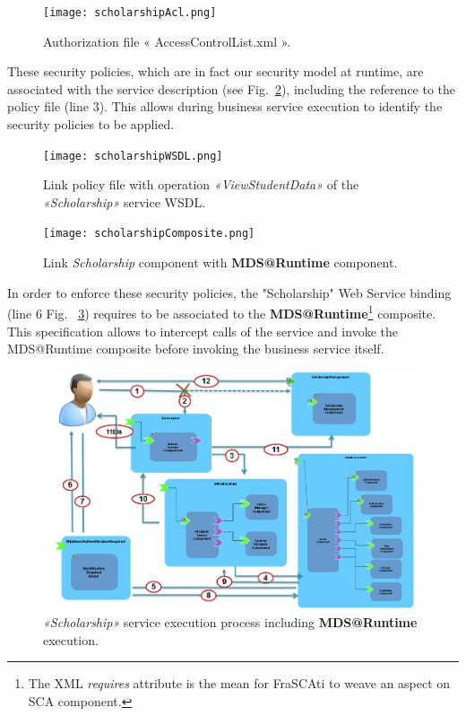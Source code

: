 \documentclass[runningheads,a4paper]{llncs}
\begin{document}
 
\begin{figure}
\centering
\texttt{[image: scholarshipAcl.png]}
\caption{Authorization file « AccessControlList.xml ».}
\label{fig:acl}
\end{figure}


These security policies, which are in fact our security model at runtime, are associated with the service description (see Fig.~\ref{fig:wsdl}), including the reference to the policy file (line 3). This allows during business service execution to identify the security policies to be applied.
\begin{figure}  
\centering
\texttt{[image: scholarshipWSDL.png]}
\caption{Link policy file with operation \emph{«ViewStudentData»} of the \emph{«Scholarship»} service WSDL.}
\label{fig:wsdl}
\end{figure}

\begin{figure}  
\center
\texttt{[image: scholarshipComposite.png]}
\caption{Link \emph{Scholarship} component with \textbf{MDS@Runtime} component.}
\label{fig:gestionEtudiant}
\end{figure}


In order to enforce these security policies, the "Scholarship"  Web Service binding (line 6 Fig. ~\ref{fig:gestionEtudiant}) requires to be associated to the \textbf{MDS@Runtime}\footnote{The XML \emph{requires} attribute is the mean for FraSCAti to weave an aspect on SCA component.} composite. This specification allows to intercept calls of the service and invoke the  MDS@Runtime composite before invoking the business service itself.
\begin{figure} 
\center
\includegraphics[height=200pt, width=320pt]{process.png}
\caption{\emph{«Scholarship»} service execution process including   \textbf{MDS@Runtime} execution.}
\label{fig:process}
\end{figure}
\end{document}
